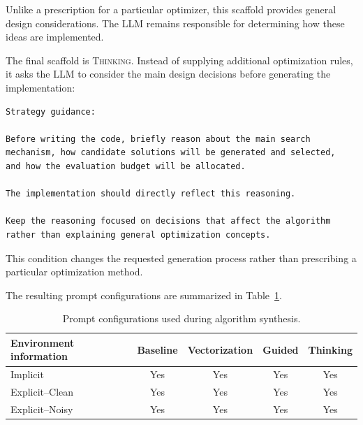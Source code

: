 Unlike a prescription for a particular optimizer, this scaffold provides
general design considerations. The LLM remains responsible for determining
how these ideas are implemented.

The final scaffold is \textsc{Thinking}. Instead of supplying additional
optimization rules, it asks the LLM to consider the main design decisions
before generating the implementation:

\begin{verbatim}
Strategy guidance:

Before writing the code, briefly reason about the main search
mechanism, how candidate solutions will be generated and selected,
and how the evaluation budget will be allocated.

The implementation should directly reflect this reasoning.

Keep the reasoning focused on decisions that affect the algorithm
rather than explaining general optimization concepts.
\end{verbatim}

This condition changes the requested generation process rather than
prescribing a particular optimization method.


The resulting prompt configurations are summarized in
Table~\ref{tab:prompt_configuration_matrix}.

\begin{table}[htbp]
\centering
\caption{Prompt configurations used during algorithm synthesis.}
\label{tab:prompt_configuration_matrix}

\begin{tabular}{|l|c|c|c|c|}
    \hline
    \textbf{Environment information}
    & \textbf{Baseline}
    & \textbf{Vectorization}
    & \textbf{Guided}
    & \textbf{Thinking} \\
    \hline

    Implicit
    & Yes & Yes & Yes & Yes \\
    \hline

    Explicit--Clean
    & Yes & Yes & Yes & Yes \\
    \hline

    Explicit--Noisy
    & Yes & Yes & Yes & Yes \\
    \hline
\end{tabular}

\end{table}

